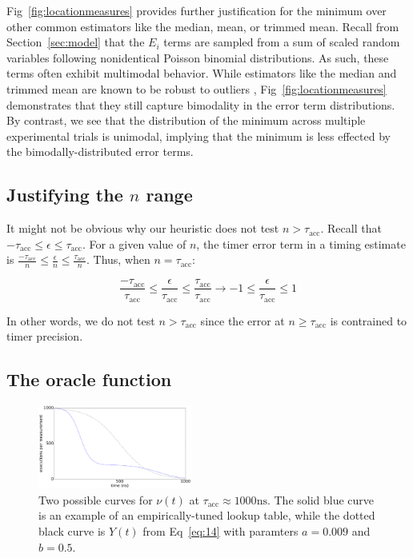 \documentclass[conference]{IEEEtran}
\begin{document}
Fig~\ref{fig:locationmeasures} provides further justification for the minimum over other
common estimators like the median, mean, or trimmed mean. Recall from
Section~\ref{sec:model} that the $E_i$ terms are sampled from a sum of scaled random
variables following nonidentical Poisson binomial distributions. As such, these terms often
exhibit multimodal behavior. While estimators like the median and trimmed mean are known to
be robust to outliers , Fig~\ref{fig:locationmeasures} demonstrates that they
still capture bimodality in the error term distributions. By contrast, we see that the
distribution of the minimum across multiple experimental trials is unimodal, implying that
the minimum is less effected by the bimodally-distributed error terms.

\subsection{Justifying the $n$ range}

It might not be obvious why our heuristic does not test $n > \tau_{\textrm{acc}}$. Recall
that $-\tau_{\textrm{acc}} \le \epsilon \le \tau_{\textrm{acc}}$. For a given value of $n$,
the timer error term in a timing estimate is $\frac{-\tau_{\textrm{acc}}}{n} \le
\frac{\epsilon}{n} \le \frac{\tau_{\textrm{acc}}}{n}$. Thus, when $n = \tau_{\textrm{acc}}$:

\begin{equation}
\frac{-\tau_{\textrm{acc}}}{\tau_{\textrm{acc}}} \le \frac{\epsilon}{\tau_{\textrm{acc}}} \le \frac{\tau_{\textrm{acc}}}{\tau_{\textrm{acc}}} \to -1 \le \frac{\epsilon}{\tau_{\textrm{acc}}} \le 1
\end{equation}

In other words, we do not test $n > \tau_{\textrm{acc}}$ since the error at $n \ge
\tau_{\textrm{acc}}$ is contrained to timer precision.

\subsection{The oracle function}

\begin{figure}
\centering
\includegraphics[width=0.45\textwidth]{figures/fig5/oracle}
\caption{Two possible curves for $\nu(t)$ at $\tau_{\textrm{acc}} \approx 1000 \textrm{ns}$.
The solid blue curve is an example of an empirically-tuned lookup table, while the dotted
black curve is $Y(t)$ from Eq~\ref{eq:14} with paramters $a = 0.009$ and $b = 0.5$.}
\label{fig:scaling}
\end{figure}
\end{document}
